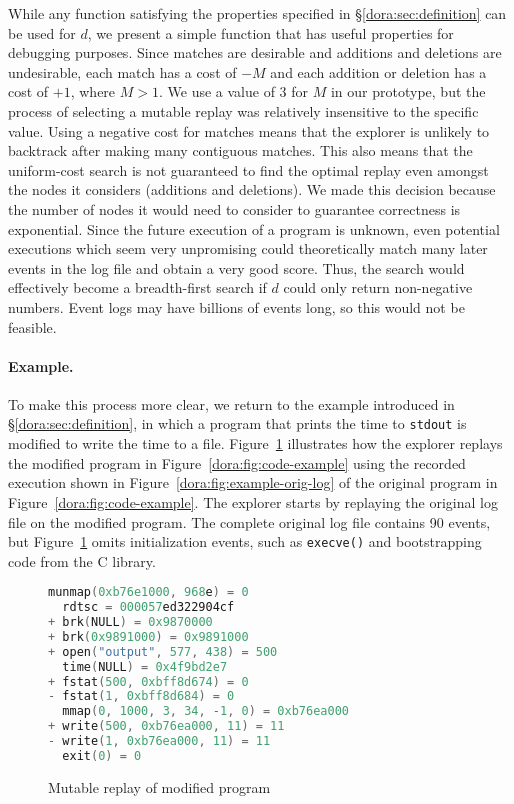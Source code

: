 While any function satisfying the properties specified in
\S\ref{dora:sec:definition} can be used for $d$, we present a simple
function that has useful properties for debugging purposes.
Since matches are desirable and additions and deletions are undesirable,
each match has a cost of $-M$ and each addition or deletion has a cost of
$+1$, where $M > 1$. We use a value of $3$ for $M$ in our prototype,
but the process of selecting a mutable replay was relatively
insensitive to the specific value.
Using a negative cost for matches
means that the explorer is unlikely to backtrack after making many
contiguous matches.  This also means that the uniform-cost search
is not guaranteed to find the optimal replay even amongst the nodes it
considers (additions and deletions).  We made this decision because
the number of nodes it would need to consider to guarantee correctness
is exponential. Since the future execution of a program is 
unknown, even potential executions which seem very unpromising could
theoretically match many later events in the log file and obtain a very good
score. Thus, the search would effectively become a breadth-first search if $d$
could only return non-negative numbers.  Event logs may have billions of
events long, so this would not be feasible.

\paragraph{Example.}
To make this process more clear, we return to the example introduced in
\S\ref{dora:sec:definition}, in which a program that prints the time to
{\tt stdout} is modified to write the time to a file.
Figure~\ref{dora:fig:diff} illustrates how the explorer replays the
modified program in Figure~\ref{dora:fig:code-example} using the recorded execution
shown in Figure~\ref{dora:fig:example-orig-log} of the original program in 
Figure~\ref{dora:fig:code-example}. The explorer starts by replaying the
original log file on the modified program. The complete original log file
contains 90 events, but Figure~\ref{dora:fig:diff} omits initialization
events, such as {\tt execve()} and bootstrapping code from the C library. 

\begin{figure}
\centering
\begin{minipage}{.6\textwidth}
\small
\begin{lstlisting}[framexleftmargin=5pt,language=C,basicstyle=\ttfamily]
  munmap(0xb76e1000, 968e) = 0
  rdtsc = 000057ed322904cf
+ brk(NULL) = 0x9870000
+ brk(0x9891000) = 0x9891000
+ open("output", 577, 438) = 500
  time(NULL) = 0x4f9bd2e7
+ fstat(500, 0xbff8d674) = 0
- fstat(1, 0xbff8d684) = 0
  mmap(0, 1000, 3, 34, -1, 0) = 0xb76ea000
+ write(500, 0xb76ea000, 11) = 11
- write(1, 0xb76ea000, 11) = 11
  exit(0) = 0
\end{lstlisting}
\end{minipage}
\caption{Mutable replay of modified program}
\label{dora:fig:diff}
\end{figure}

